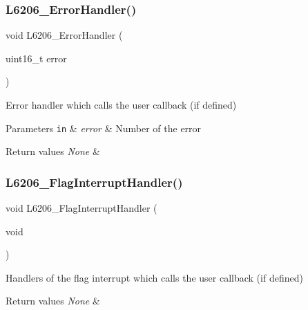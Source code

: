 \subsubsection{\texorpdfstring{L6206\+\_\+\+Error\+Handler()}{L6206\_ErrorHandler()}}
{\footnotesize\ttfamily void L6206\+\_\+\+Error\+Handler (\begin{DoxyParamCaption}\item[{uint16\+\_\+t}]{error }\end{DoxyParamCaption})}



Error handler which calls the user callback (if defined) 


\begin{DoxyParams}[1]{Parameters}
\mbox{\tt in}  & {\em error} & Number of the error \\
\hline
\end{DoxyParams}

\begin{DoxyRetVals}{Return values}
{\em None} & \\
\hline
\end{DoxyRetVals}
\mbox{\label{group___l6206___private__functions_gabbcf9b4b7f5b609bab60c5fe3906c4b5}} 
\subsubsection{\texorpdfstring{L6206\+\_\+\+Flag\+Interrupt\+Handler()}{L6206\_FlagInterruptHandler()}}
{\footnotesize\ttfamily void L6206\+\_\+\+Flag\+Interrupt\+Handler (\begin{DoxyParamCaption}\item[{void}]{ }\end{DoxyParamCaption})}



Handlers of the flag interrupt which calls the user callback (if defined) 


\begin{DoxyRetVals}{Return values}
{\em None} & \\
\hline
\end{DoxyRetVals}
\mbox{\label{group___l6206___private__functions_gae2996e5793bc86d91bd050faf43da273}} 
